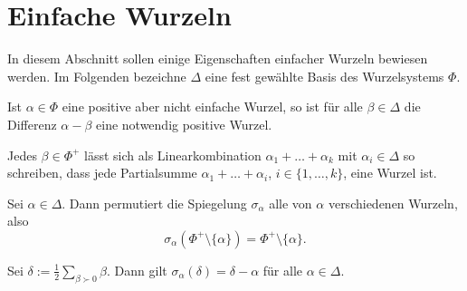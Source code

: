 \section{Einfache Wurzeln}

In diesem Abschnitt sollen einige Eigenschaften einfacher Wurzeln bewiesen werden.  
Im Folgenden bezeichne $\Delta$ eine fest gewählte Basis des Wurzelsystems $\Phi$.

\begin{lem}
  Ist $\alpha \in \Phi$ eine positive aber nicht einfache Wurzel, so ist für alle $\beta \in \Delta$ die Differenz $\alpha - \beta$ eine notwendig positive Wurzel.
\end{lem}

\begin{cor}
  Jedes $\beta \in \Phi^+$ lässt sich als Linearkombination $\alpha_1 + \dots + \alpha_k$ mit $\alpha_i \in \Delta$ so schreiben, dass jede Partialsumme $\alpha_1 + \dots + \alpha_i$, $i \in \{1,\dots,k\}$, eine Wurzel ist.
\end{cor}

\begin{lem}
  Sei $\alpha \in \Delta$. 
  Dann permutiert die Spiegelung $\sigma_\alpha$ alle von $\alpha$ verschiedenen Wurzeln, also 
  \begin{displaymath}
    \sigma_\alpha(\Phi^+ \setminus \{\alpha\}) = \Phi^+ \setminus \{\alpha\}.
  \end{displaymath}
\end{lem}

\begin{cor}
  Sei $\delta := \tfrac{1}{2} \sum_{\beta \succ 0} \beta$.
  Dann gilt $\sigma_\alpha(\delta) = \delta - \alpha$ für alle $\alpha \in \Delta$.
\end{cor}
